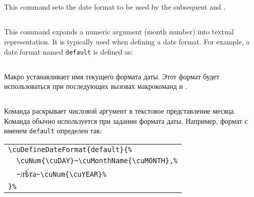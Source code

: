 \begin{EN}
\subsection{}
This command sets the date format to be used by the subsequent  and .

\subsection{}
This command expands a numeric argument (month number) into textual representation. It is typically used when defining a date format.
For example, a date format named \texttt{default} is defined as:
\end{EN}

\begin{RU}
\subsection{}
Макро устанавливает имя текущего формата даты. Этот формат будет использоваться при последующих вызовах макрокоманд
 и .

\subsection{}
Команда раскрывает числовой аргумент в текстовое представление месяца. Команда обычно используется при задании формата
даты. Например, формат с именем \texttt{default} определен так:
\end{RU}
%
\begin{center}
\begin{churchslavonic}
\begin{tabular}{l}
\verb+\cuDefineDateFormat{default}{%+\\
\verb+  \cuNum{\cuDAY}~\cuMonthName{\cuMONTH},%+\\
\verb+  ~+лѣ́та\verb+~\cuNum{\cuYEAR}%+\\
\verb+}%+\\
\end{tabular}
\end{churchslavonic}
\end{center}

